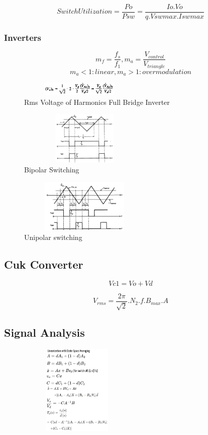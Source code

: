 \documentclass[twocolumn, ]{article}
\begin{document}
\begin{equation}
Switch Utilization= \frac{Po}{Psw}=\frac{Io.Vo}{q.Vswmax.Iswmax}
\end{equation}

\subsubsection*{Inverters}

$$ m_f=\dfrac{f_s}{f_1}, m_a=\dfrac{V_{control}}{V_{triangle}}$$
$$m_a<1: linear, m_a>1: overmodulation$$

\begin{figure}[!ht]
	\includegraphics[width=2.3in,height=0.25in]{RmsVoltageofHarmonicsFullBridgeInverter.png}
	\caption{Rms Voltage of Harmonics Full Bridge Inverter}
\end{figure}
\begin{figure}[!ht]
	\includegraphics[width=2.5in,height=1in]{bipolar1.png}
	\caption{Bipolar Switching}
\end{figure}
\begin{figure}[!ht]
	\includegraphics[width=2.5in,height=1in]{unipolar1.png}
	\caption{Unipolar switching}
\end{figure}
\subsection*{\small Cuk Converter}
\small
\begin{equation}
Vc1=Vo+Vd
\end{equation}





\begin{equation}
V_{rms}=\frac{2\pi}{\sqrt{2}}.N_{2}.f.B_{max}.A
\end{equation}

\subsection*{\Small Signal Analysis}
 \begin{figure}[!ht]
	\includegraphics[width=2.2in,height=1.7in]{Small Signal.png}
\end{figure}
\end{document}
